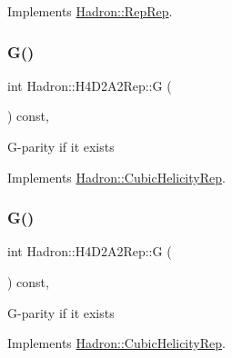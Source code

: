 Implements \mbox{\hyperlink{structHadron_1_1RepRep_a92c8802e5ed7afd7da43ccfd5b7cd92b}{Hadron\+::\+Rep\+Rep}}.

\mbox{\label{structHadron_1_1H4D2A2Rep_a07c16e2dbfa9c820954f66f17b0a270d}} 
\subsubsection{\texorpdfstring{G()}{G()}\hspace{0.1cm}{\footnotesize\ttfamily [1/3]}}
{\footnotesize\ttfamily int Hadron\+::\+H4\+D2\+A2\+Rep\+::G (\begin{DoxyParamCaption}{ }\end{DoxyParamCaption}) const\hspace{0.3cm}{\ttfamily [inline]}, {\ttfamily [virtual]}}

G-\/parity if it exists 

Implements \mbox{\hyperlink{structHadron_1_1CubicHelicityRep_a50689f42be1e6170aa8cf6ad0597018b}{Hadron\+::\+Cubic\+Helicity\+Rep}}.

\mbox{\label{structHadron_1_1H4D2A2Rep_a07c16e2dbfa9c820954f66f17b0a270d}} 
\subsubsection{\texorpdfstring{G()}{G()}\hspace{0.1cm}{\footnotesize\ttfamily [2/3]}}
{\footnotesize\ttfamily int Hadron\+::\+H4\+D2\+A2\+Rep\+::G (\begin{DoxyParamCaption}{ }\end{DoxyParamCaption}) const\hspace{0.3cm}{\ttfamily [inline]}, {\ttfamily [virtual]}}

G-\/parity if it exists 

Implements \mbox{\hyperlink{structHadron_1_1CubicHelicityRep_a50689f42be1e6170aa8cf6ad0597018b}{Hadron\+::\+Cubic\+Helicity\+Rep}}.

\mbox{\label{structHadron_1_1H4D2A2Rep_a07c16e2dbfa9c820954f66f17b0a270d}} 
